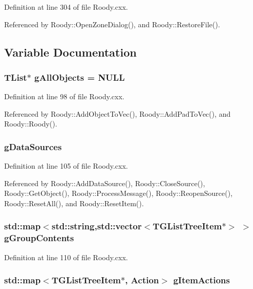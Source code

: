 Definition at line 304 of file Roody.cxx.

Referenced by Roody::OpenZoneDialog(), and Roody::RestoreFile().

\subsection{Variable Documentation}
\subsubsection[{gAllObjects}]{\setlength{\rightskip}{0pt plus 5cm}TList$\ast$ {\bf gAllObjects} = NULL}\label{Roody_8cxx_a228bf9afef4c54d62ad5d408db7311d0}


Definition at line 98 of file Roody.cxx.

Referenced by Roody::AddObjectToVec(), Roody::AddPadToVec(), and Roody::Roody().
\subsubsection[{gDataSources}]{ {\bf gDataSources}}\label{Roody_8cxx_a9af39400d262b56f7e186b62b786c424}


Definition at line 105 of file Roody.cxx.

Referenced by Roody::AddDataSource(), Roody::CloseSource(), Roody::GetObject(), Roody::ProcessMessage(), Roody::ReopenSource(), Roody::ResetAll(), and Roody::ResetItem().
\subsubsection[{gGroupContents}]{\setlength{\rightskip}{0pt plus 5cm}std::map$<$std::string,std::vector$<$TGListTreeItem$\ast$$>$ $>$ {\bf gGroupContents}}\label{Roody_8cxx_a84676ea47b401c2f644bcef0359b27d7}


Definition at line 110 of file Roody.cxx.
\subsubsection[{gItemActions}]{\setlength{\rightskip}{0pt plus 5cm}std::map$<$TGListTreeItem$\ast$, {\bf Action}$>$ {\bf gItemActions}}\label{Roody_8cxx_a48bffd501d6381c5876ae14bfaee41cf}


